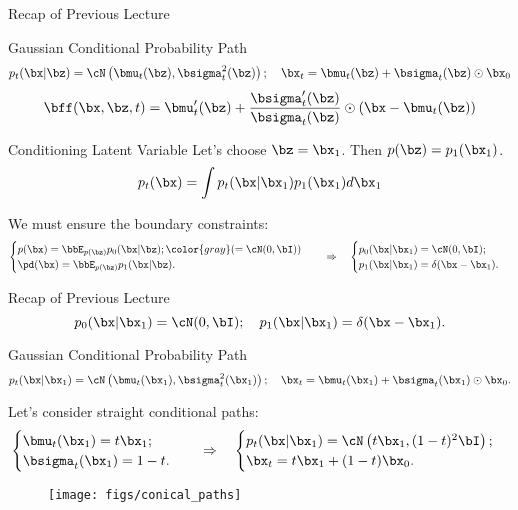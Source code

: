 \documentclass{beamer}
\begin{document}
\begin{frame}{Recap of Previous Lecture}
	\begin{block}{Gaussian Conditional Probability Path}
		\vspace{-0.3cm}
		\[
			p_t(\bx | \bz) = \cN\left(\bmu_t(\bz), \bsigma_t^2(\bz)\right); \quad \bx_t = \bmu_t(\bz) + \bsigma_t(\bz) \odot \bx_0
		\]
		\vspace{-0.3cm}
		\[
			\bff(\bx, \bz, t) =  \bmu_t'(\bz) + \frac{\bsigma_t'(\bz)}{\bsigma_t(\bz)} \odot (\bx - \bmu_t(\bz))
		\]
		\vspace{-0.3cm}
	\end{block}
	\begin{block}{Conditioning Latent Variable}
		Let’s choose $\bz = \bx_1$. Then $p(\bz) = p_1(\bx_1)$.
		\[
			p_t(\bx) = \int p_t(\bx | \bx_1) p_1(\bx_1) d \bx_1
		\]
		\vspace{-0.5cm}
	\end{block}
	We must ensure the boundary constraints:
	\[
		\begin{cases}
			p(\bx) = \bbE_{p(\bz)} p_0(\bx | \bz); {\color{gray}(= \cN(0, \bI))} \\
			\pd(\bx) = \bbE_{p(\bz)} p_1(\bx | \bz).
		\end{cases}
		\quad \Rightarrow \quad 
		\begin{cases}
			p_0(\bx | \bx_1) = \cN(0, \bI); \\
			p_1(\bx | \bx_1) = \delta(\bx - \bx_1).
		\end{cases}
	\]
	\vspace{-0.3cm}
\end{frame}
\begin{frame}{Recap of Previous Lecture}
	\[
		p_0(\bx | \bx_1) = \cN(0, \bI); \quad p_1(\bx | \bx_1) = \delta(\bx - \bx_1).
	\]
	
	\begin{block}{Gaussian Conditional Probability Path}
		\vspace{-0.5cm}
		\[
			p_t(\bx | \bx_1) = \cN\left(\bmu_t(\bx_1), \bsigma_t^2(\bx_1)\right); \quad \bx_t = \bmu_t(\bx_1) +  \bsigma_t(\bx_1) \odot \bx_0.
		\]
		\vspace{-0.6cm}
	\end{block}
	Let’s consider straight conditional paths:	
	\[
		\begin{cases}
			\bmu_t(\bx_1) = t \bx_1; \\
			\bsigma_t(\bx_1) = 1 - t.
		\end{cases}
		\quad \Rightarrow \quad 
		\begin{cases}
			p_t(\bx | \bx_1) = \cN\left(t \bx_1, (1-t)^2 \bI\right); \\
		 	\bx_t = t \bx_1 + (1 - t) \bx_0. 
	 \end{cases}
	\]
	\vspace{-0.3cm}
	\begin{figure}
		\centering
		\texttt{[image: figs/conical\_paths]}
	\end{figure}
\end{frame}
\end{document}
